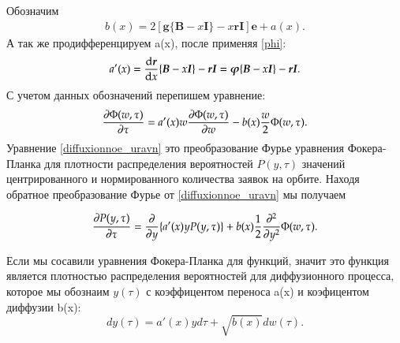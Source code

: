 Обозначим 
\begin{align}
	b(x)=2[\boldsymbol{g}\{\boldsymbol{B}-x\boldsymbol{I}\}-x\boldsymbol{rI}]\boldsymbol{e}+ a(x).
\end{align}
А так же продифференцируем a(x), после применяя \eqref{phi}:
\begin{align}
	a'(x)=\dv{\boldsymbol{r}}{x}\{\boldsymbol{B}-x\boldsymbol{I}\}-\boldsymbol{rI}=\boldsymbol{\varphi}\{\boldsymbol{B}-x\boldsymbol{I}\}-\boldsymbol{rI}.
\end{align}
С учетом данных обозначений перепишем уравнение:
\begin{align} \label{diffuxionnoe_uravn}
	\pdv{\Phi (w, \tau)}{\tau} =a'(x)w\pdv{\Phi (w, \tau)}{w}-b(x) \frac{w}{2}\Phi (w, \tau).
\end{align}
Уравнение \eqref{diffuxionnoe_uravn} это преобразование Фурье уравнения Фокера-Планка для плотности распределения вероятностей $P(y, \tau)$ 
значений центрированного и нормированного количества заявок на орбите. Находя обратное преобразование Фурье от \eqref{diffuxionnoe_uravn} мы получаем

\begin{align} \label{diffuxionnoe_uravn}
	\pdv{P (y, \tau)}{\tau} =\pdv{}{y}\{a'(x)yP (y, \tau)\}+b(x) \frac{1}{2}\frac{\partial^2}{\partial y^2}\Phi (w, \tau).
\end{align}

Если мы сосавили уравнения Фокера-Планка для функций, значит это функция является плотностью распределения вероятностей для диффузионного процесса, которое мы обознаим $y(\tau)$ с коэффицентом переноса a(x) и коэфицентом диффузии b(x):
\[dy(\tau)=a'(x)yd\tau +\sqrt{b(x)}dw(\tau).\]







